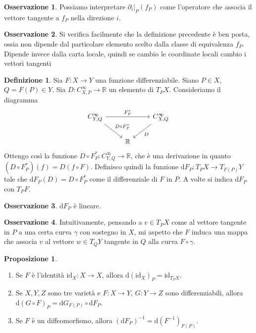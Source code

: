 \documentclass[a4paper,11pt]{article}
\theoremstyle{definition}
\newtheorem{osservazione}{Osservazione}[section]
\newtheorem{definizione}{Definizione}[section]
\theoremstyle{theorem}
\newtheorem{proposizione}{Proposizione}[section]
\begin{document}
\begin{osservazione}
	Possiamo interpretare $\left.\partial_i\right|_{P}(f_P)$ come l'operatore che associa il vettore tangente a $f_P$ nella direzione $i$.
\end{osservazione}
\begin{osservazione}
	Si verifica facilmente che la definizione precedente è ben posta, ossia non dipende dal particolare elemento scelto dalla classe di equivalenza $f_P$. Dipende invece dalla carta locale, quindi se cambio le coordinate locali cambio i vettori tangenti
\end{osservazione}
\begin{definizione}
	Sia $F\colon X\to Y$ una funzione differenziabile. Siano $P\in X$, $Q=F(P)\in Y$. Sia $D\colon C^\infty_{X,P}\to\mathbb{R}$ un elemento di $T_PX$. Consideriamo il diagramma
	\[\begin{tikzcd}
	C^\infty_{Y,Q}\arrow[rr, "F^*_P"]\arrow[dr, "D\circ F^*_P"] & &C^\infty_{X,Q}\arrow[dl, "D"]\\
	& \mathbb{R}	
	\end{tikzcd}\]
	Ottengo così la funzione $D\circ F^*_P\colon C^\infty_{Y,Q}\to\mathbb{R}$, che è una derivazione in quanto $(D\circ F^*_P)(f)=D(f\circ F)$. Definisco quindi la funzione $\mathrm{d}F_P\colon T_PX\to T_{F(P)}Y$ tale che $\mathrm{d}F_P(D)=D\circ F^*_P$ come il differenziale di $F$ in $P$. A volte si indica $\mathrm{d}F_P$ con $T_PF$.
\end{definizione}
\begin{osservazione}
	$\mathrm{d}F_P$ è lineare.
\end{osservazione}
\begin{osservazione}
	Intuitivamente, pensando a $v\in T_PX$ come al vettore tangente in $P$ a una certa curva $\gamma$ con sostegno in $X$, mi aspetto che $F$ induca una mappa che associa $v$ al vettore $w\in T_QY$ tangente in $Q$ alla curva $F\circ\gamma$.
\end{osservazione}
\begin{proposizione}
	\begin{enumerate}
		\item Se $F$ è l'identità $\textrm{id}_X\colon X\to X$, allora $\mathrm{d}(\textrm{id}_X)_P=\textrm{id}_{T_PX}$.
		\item Se $X,Y,Z$ sono tre varietà e $F\colon X\to Y$, $G\colon Y\to Z$ sono differenziabili, allora $\mathrm{d}(G\circ F)_P=\mathrm{d}G_{F(P)}\circ\mathrm{d}F_P$.
		\item Se $F$ è un diffeomorfismo, allora $(\mathrm{d}F_P)^{-1}=\mathrm{d}(F^{-1})_{F(P)}$.
	\end{enumerate}
\end{proposizione}
\end{document}

